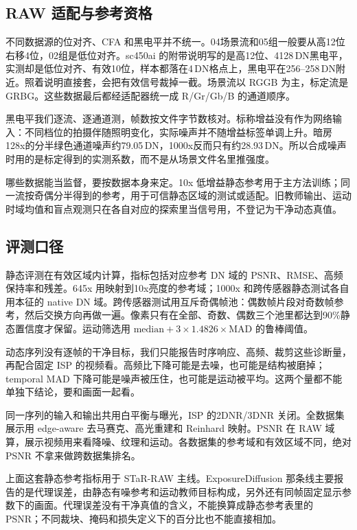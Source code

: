 \documentclass[11pt,a4paper,UTF8,fontset=fandol]{ctexart}
\newcommand{\dn}{\ensuremath{\,\mathrm{DN}}}
\begin{document}
\subsection{RAW 适配与参考资格}

不同数据源的位对齐、CFA 和黑电平并不统一。04场景流和05组一般要从高12位右移4位，02组是低位对齐。sc450ai 的附带说明写的是高12位、4128\dn 黑电平，实测却是低位对齐、有效10位，样本都落在4\dn 格点上，黑电平在256--258\dn 附近。照着说明直接套，会把有效信号裁掉一截。场景流以 RGGB 为主，标定流是 GRBG。这些数据最后都经适配器统一成 R/Gr/Gb/B 的通道顺序。

黑电平我们逐流、逐通道测，帧数按文件字节数核对。标称增益没有作为网络输入：不同档位的拍摄伴随照明变化，实际噪声并不随增益标签单调上升。暗房128x的分半绿色通道噪声约79.05\dn，1000x反而只有约28.93\dn。所以合成噪声时用的是标定得到的实测系数，而不是从场景文件名里推强度。

哪些数据能当监督，要按数据本身来定。10x 低增益静态参考用于主方法训练；同一流按奇偶分半得到的参考，用于可信静态区域的测试或适配。旧教师输出、运动时域均值和盲点观测只在各自对应的探索里当信号用，不登记为干净动态真值。

\subsection{评测口径}

静态评测在有效区域内计算，指标包括对应参考 DN 域的 PSNR、RMSE、高频保持率和残差。645x 用映射到10x亮度的参考域；1000x 和跨传感器静态测试各自用本征的 native DN 域。跨传感器测试用互斥奇偶帧池：偶数帧片段对奇数帧参考，然后交换方向再做一遍。像素只有在全部、奇数、偶数三个池里都达到90\%静态置信度才保留。运动筛选用 $\mathrm{median}+3\times1.4826\times\mathrm{MAD}$ 的鲁棒阈值。

动态序列没有逐帧的干净目标，我们只能报告时序响应、高频、裁剪这些诊断量，再配合固定 ISP 的视频看。高频比下降可能是去噪，也可能是结构被磨掉；temporal MAD 下降可能是噪声被压住，也可能是运动被平均。这两个量都不能单独下结论，要和画面一起看。

同一序列的输入和输出共用白平衡与曝光，ISP 的2DNR/3DNR 关闭。全数据集展示用 edge-aware 去马赛克、高光重建和 Reinhard 映射。PSNR 在 RAW 域算，展示视频用来看降噪、纹理和运动。各数据集的参考域和有效区域不同，绝对 PSNR 不拿来做跨数据集排名。

上面这套静态参考指标用于 STaR-RAW 主线。ExposureDiffusion 那条线主要报告的是代理误差，由静态有噪参考和运动教师目标构成，另外还有同帧固定显示参数下的画面。代理误差没有干净真值的含义，不能换算成静态参考表里的 PSNR；不同裁块、掩码和损失定义下的百分比也不能直接相加。
\end{document}
